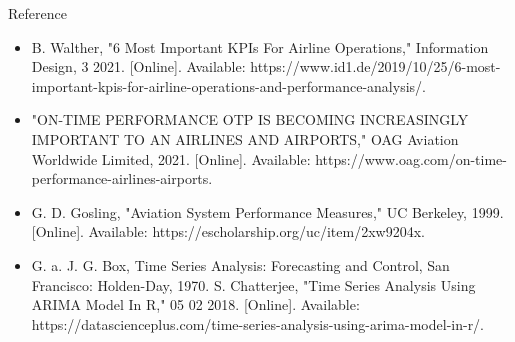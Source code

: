\documentclass[11pt]{beamer}
\begin{document}
\begin{frame} {Reference}
\tiny
\begin{itemize}
\item B. Walther, "6 Most Important KPIs For Airline Operations," Information Design, 3 2021. [Online]. Available: https://www.id1.de/2019/10/25/6-most-important-kpis-for-airline-operations-and-performance-analysis/. 
\item "ON-TIME PERFORMANCE OTP IS BECOMING INCREASINGLY IMPORTANT TO AN AIRLINES AND AIRPORTS," OAG Aviation Worldwide Limited, 2021. [Online]. Available: https://www.oag.com/on-time-performance-airlines-airports.\\
\item G. D. Gosling, "Aviation System Performance Measures," UC Berkeley, 1999. [Online]. Available: https://escholarship.org/uc/item/2xw9204x.\\
\item G. a. J. G. Box, Time Series Analysis: Forecasting and Control, San Francisco: Holden-Day, 1970. 
S. Chatterjee, "Time Series Analysis Using ARIMA Model In R," 05 02 2018. [Online]. Available: https://datascienceplus.com/time-series-analysis-using-arima-model-in-r/.
\end{itemize}
\end{frame}
\end{document}
